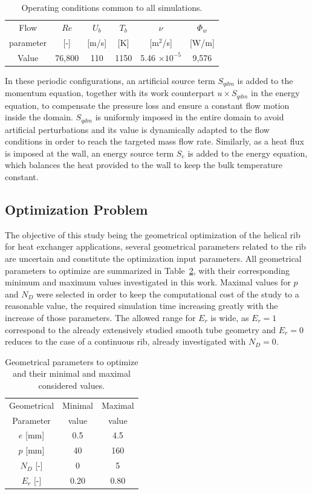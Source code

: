 \begin{table}
\small
\centering
\begin{tabular}{c|c|c|c|c|c}
  Flow & $Re$ & $U_b$ & $T_b$ & $\nu$ & $\Phi_w$    \\
  parameter & [-]  & [m/s] & [K]   & [m$^2$/s] & [W/m] \\
  \hline
  Value & 76,800 & 110 & 1150 & 5.46 $\times 10^{-5}$ & 9,576 \\
\end{tabular}
\caption{Operating conditions common to all simulations.}
\label{tab_opconditions}
\end{table}

In these periodic configurations, an artificial source term $S_{qdm}$ is added to the momentum equation, together with its work counterpart $u \times S_{qdm}$ in the energy equation, to compensate the pressure loss and ensure a constant flow motion inside the domain. $S_{qdm}$ is uniformly imposed in the entire domain to avoid artificial perturbations and its value is dynamically adapted to the flow conditions in order to reach the targeted mass flow rate. Similarly, as a heat flux is imposed at the wall, an energy source term $S_e$ is added to the energy equation, which balances the heat provided to the wall to keep the bulk temperature constant.\\

\subsection{Optimization Problem}

The objective of this study being the geometrical optimization of the helical rib for heat exchanger applications, several geometrical parameters related to the rib are uncertain and constitute the optimization input parameters. All geometrical parameters to optimize are summarized in Table~\ref{tab_parameters}, with their corresponding minimum and maximum values investigated in this work. Maximal values for $p$ and $N_D$ were selected in order to keep the computational cost of the study to a reasonable value, the required simulation time increasing greatly with the increase of those parameters. The allowed range for $E_r$ is wide, as $E_r = 1$ correspond to the already extensively studied smooth tube geometry and $E_r = 0$ reduces to the case of a continuous rib, already investigated with $N_D = 0$.\\

\begin{table}
\small
\centering
\begin{tabular}{c|c|c}
  Geometrical & Minimal & Maximal \\
  Parameter & value & value \\
  \hline
  $e$ [mm] & 0.5 & 4.5 \\
  $p$ [mm] & 40 & 160 \\
  $N_D$ [-] & 0 & 5 \\
  $E_r$ [-] & 0.20 & 0.80 \\
\end{tabular}
\caption{Geometrical parameters to optimize and their minimal and maximal considered values.}
\label{tab_parameters}
\end{table}

